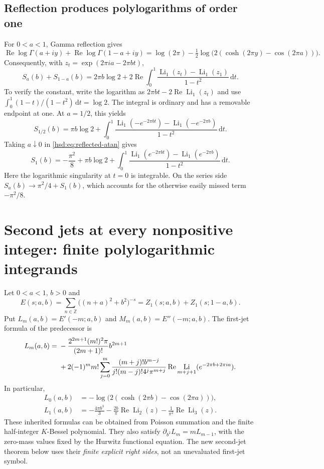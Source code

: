 \documentclass[11pt]{article}
\numberwithin{equation}{section}
\theoremstyle{definition}\newtheorem{definition}[theorem]{Definition}
\theoremstyle{remark}\newtheorem{remark}[theorem]{Remark}
\DeclareMathOperator{\Li}{Li}
\DeclareMathOperator{\Rea}{Re}
\newcommand{\dd}{\,\mathrm d}
\begin{document}
\subsection{Reflection produces polylogarithms of order one}
For $0<a<1$, Gamma reflection gives
\[
 \Rea\log\Gamma(a+iy)+\Rea\log\Gamma(1-a+iy)
  =\log(2\pi)-\tfrac12\log\bigl(2(\cosh(2\pi y)-\cos(2\pi a))\bigr).
\]
Consequently, with $z_t=\exp(2\pi ia-2\pi bt)$,
\begin{equation}\label{hsd:eq:reflected-atan}
 S_a(b)+S_{1-a}(b)=2\pi b\log2+
 2\Rea\int_0^1\frac{\Li_1(z_t)-\Li_1(z_1)}{1-t^2}\dd t.
\end{equation}
To verify the constant, write the logarithm as
$2\pi bt-2\Rea\Li_1(z_t)$ and use
$\int_0^1(1-t)/(1-t^2)\dd t=\log2$.
The integral is ordinary and has a removable endpoint at one.
At $a=1/2$, this yields
\begin{equation}\label{hsd:eq:half-atan}
 S_{1/2}(b)=\pi b\log2+
 \int_0^1\frac{\Li_1(-e^{-2\pi bt})-\Li_1(-e^{-2\pi b})}{1-t^2}\dd t.
\end{equation}
Taking $a\downarrow0$ in \eqref{hsd:eq:reflected-atan} gives
\begin{equation}\label{hsd:eq:integer-atan}
 S_1(b)=-\frac{\pi^2}{8}+\pi b\log2+
 \int_0^1\frac{\Li_1(e^{-2\pi bt})-\Li_1(e^{-2\pi b})}{1-t^2}\dd t.
\end{equation}
Here the logarithmic singularity at $t=0$ is integrable. On the series
side $S_a(b)\to\pi^2/4+S_1(b)$, which accounts for the otherwise easily
missed term $-\pi^2/8$.

\section{Second jets at every nonpositive integer: finite polylogarithmic integrands}
\label{hsd:sec:negative}
Let $0<a<1$, $b>0$ and
\begin{equation}\label{hsd:eq:E}
 E(s;a,b)=\sum_{n\in\mathbb Z}\bigl((n+a)^2+b^2\bigr)^{-s}
         =Z_1(s;a,b)+Z_1(s;1-a,b).
\end{equation}
Put $L_m(a,b)=E'(-m;a,b)$ and $M_m(a,b)=E''(-m;a,b)$.
The first-jet formula of the predecessor \cite{hsd:predecessor} is
\begin{align}
 L_m(a,b)={}&-\frac{2^{2m+1}(m!)^2\pi}{(2m+1)!}b^{2m+1}\notag\\
 &+2(-1)^m m!\sum_{j=0}^m
 \frac{(m+j)!b^{m-j}}{j!(m-j)!4^j\pi^{m+j}}
             \Rea\Li_{m+j+1}(e^{-2\pi b+2\pi ia}).
 \label{hsd:eq:Lfinite}
\end{align}
In particular,
\begin{align}
 L_0(a,b)&=-\log\bigl(2(\cosh(2\pi b)-\cos(2\pi a))\bigr),
 \label{hsd:eq:L0}\\
 L_1(a,b)&=-\frac{4\pi b^3}{3}-\frac{2b}{\pi}\Rea\Li_2(z)
                              -\frac1{\pi^2}\Rea\Li_3(z).
 \label{hsd:eq:L1}
\end{align}
These inherited formulas can be obtained from Poisson summation and the
finite half-integer $K$-Bessel polynomial. They also satisfy
$\partial_{b^2}L_m=mL_{m-1}$, with the zero-mass values fixed by the
Hurwitz functional equation. The new second-jet theorem below uses their
\emph{finite explicit right sides}, not an unevaluated first-jet symbol.
\end{document}
